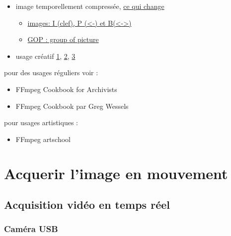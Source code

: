 \documentclass[
]{book}
\providecommand{\tightlist}{%
  \setlength{\itemsep}{0pt}\setlength{\parskip}{0pt}}
\begin{document}
\begin{itemize}
\tightlist
\item
  image temporellement compressée, \href{http://dvd-hq.info/data_compression_3.php}{ce qui change}

  \begin{itemize}
  \tightlist
  \item
    \href{https://en.wikipedia.org/wiki/Video_compression_picture_types}{images: I (clef), P (\textless-) et B(\textless-\textgreater)}
  \item
    \href{https://en.wikipedia.org/wiki/Inter_frame\#/media/File:IPB_images_sequence.png}{GOP : group of picture}
  \end{itemize}
\item
  usage créatif \href{https://www.youtube.com/watch?v=rMSsw4CZvKg}{1}, \href{https://www.youtube.com/watch?v=rSmEOk5AiN0}{2}, \href{https://www.youtube.com/watch?v=dNa0-xrKi3Q}{3}
\end{itemize}

pour des usages réguliers voir :

\begin{itemize}
\tightlist
\item
  FFmpeg Cookbook for Archivists \citep{kromer_FFmpegCookbookArchivists_2020}
\item
  FFmpeg Cookbook par Greg Wessels \citep{wessels_FFmpegCookbook_2017}
\end{itemize}

pour usages artistiques :

\begin{itemize}
\tightlist
\item
  FFmpeg artschool \citep{associationofmovingimagearchivists_FFmpegArtschool_2020}
\end{itemize}

\hypertarget{acquerir}{%
\chapter{Acquerir l'image en mouvement}\label{acquerir}}

\hypertarget{acquerir_captation}{%
\section{Acquisition vidéo en temps réel}\label{acquerir_captation}}

\hypertarget{camuxe9ra-usb}{%
\subsection{Caméra USB}\label{camuxe9ra-usb}}
\end{document}
